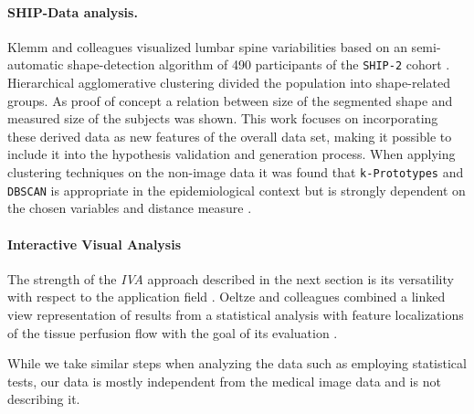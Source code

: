 \documentclass[journal]{style/vgtc} 			          %
\begin{document}
\paragraph{SHIP-Data analysis.}
Klemm and colleagues visualized lumbar spine variabilities based on an semi-automatic shape-detection algorithm of 490 participants of the \texttt{SHIP-2} cohort \cite{Klemm2013VMV}.
%
Hierarchical agglomerative clustering divided the population into shape-related groups.
%
As proof of concept a relation between size of the segmented shape and measured size of the subjects was shown.
%
This work focuses on incorporating these derived data as new features of the overall data set, making it possible to include it into the hypothesis validation and generation process.
%
When applying clustering techniques on the non-image data it was found that \texttt{k-Prototypes} and \texttt{DBSCAN} is appropriate in the epidemiological context but is strongly dependent on the chosen variables and distance measure \cite{Klemm2014BVM}.

\paragraph{Interactive Visual Analysis}
The strength of the \emph{IVA} approach described in the next section is its versatility with respect to the application field \cite{Konyha2009}.
%
Oeltze and colleagues combined a linked view representation of results from a statistical analysis with feature localizations of the tissue perfusion flow with the goal of its evaluation \cite{Oeltze2007}.
%

While we take similar steps when analyzing the data such as employing statistical tests, our data is mostly independent from the medical image data and is not describing it. %

\end{document}
